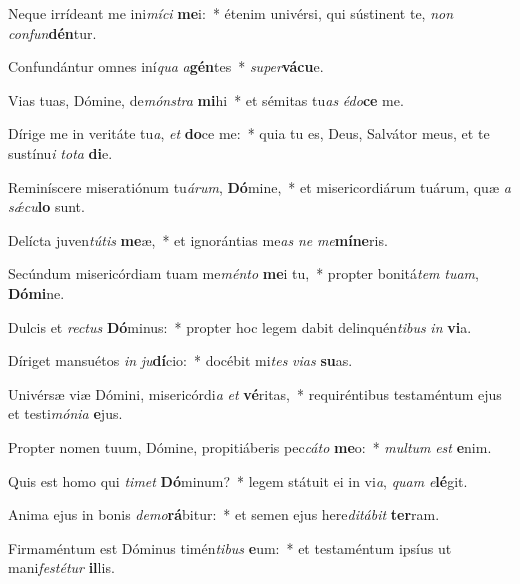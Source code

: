 \item Neque irrídeant me ini\textit{mí}\textit{ci} \textbf{me}i:~* étenim univérsi, qui sústinent te, \textit{non} \textit{con}\textit{fun}\textbf{dén}tur.
\item Confundántur omnes iní\textit{qua} \textit{a}\textbf{gén}tes~* \textit{su}\textit{per}\textbf{vá}\textbf{cu}e.
\item Vias tuas, Dómine, de\textit{móns}\textit{tra} \textbf{mi}hi~* et sémitas tu\textit{as} \textit{é}\textit{do}\textbf{ce} me.
\item Dírige me in veritáte tu\textit{a}, \textit{et} \textbf{do}ce me:~* quia tu es, Deus, Salvátor meus, et te sustínu\textit{i} \textit{to}\textit{ta} \textbf{di}e.
\item Reminíscere miseratiónum tu\textit{á}\textit{rum}, \textbf{Dó}mine,~* et misericordiárum tuárum, quæ \textit{a} \textit{sǽ}\textit{cu}\textbf{lo} sunt.
\item Delícta juven\textit{tú}\textit{tis} \textbf{me}æ,~* et ignorántias me\textit{as} \textit{ne} \textit{me}\textbf{mí}\textbf{ne}ris.
\item Secúndum misericórdiam tuam me\textit{mén}\textit{to} \textbf{me}i tu,~* propter bonitá\textit{tem} \textit{tu}\textit{am}, \textbf{Dó}\textbf{mi}ne.
\item Dulcis et \textit{rec}\textit{tus} \textbf{Dó}minus:~* propter hoc legem dabit delinquén\textit{ti}\textit{bus} \textit{in} \textbf{vi}a.
\item Díriget mansuétos \textit{in} \textit{ju}\textbf{dí}cio:~* docébit mi\textit{tes} \textit{vi}\textit{as} \textbf{su}as.
\item Univérsæ viæ Dómini, misericórdi\textit{a} \textit{et} \textbf{vé}ritas,~* requiréntibus testaméntum ejus et testi\textit{mó}\textit{ni}\textit{a} \textbf{e}jus.
\item Propter nomen tuum, Dómine, propitiáberis pec\textit{cá}\textit{to} \textbf{me}o:~* \textit{mul}\textit{tum} \textit{est} \textbf{e}nim.
\item Quis est homo qui \textit{ti}\textit{met} \textbf{Dó}minum?~* legem státuit ei in vi\textit{a}, \textit{quam} \textit{e}\textbf{lé}git.
\item Anima ejus in bonis \textit{de}\textit{mo}\textbf{rá}bitur:~* et semen ejus here\textit{di}\textit{tá}\textit{bit} \textbf{ter}ram.
\item Firmaméntum est Dóminus timén\textit{ti}\textit{bus} \textbf{e}um:~* et testaméntum ipsíus ut mani\textit{fes}\textit{té}\textit{tur} \textbf{il}lis.
